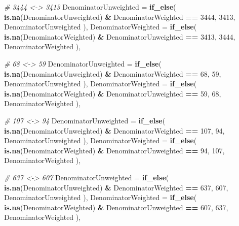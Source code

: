 \documentclass[
]{article}
\newenvironment{Shaded}{\begin{snugshade}}{\end{snugshade}}
\newcommand{\AttributeTok}[1]{\textcolor[rgb]{0.13,0.29,0.53}{#1}}
\newcommand{\CommentTok}[1]{\textcolor[rgb]{0.56,0.35,0.01}{\textit{#1}}}
\newcommand{\DecValTok}[1]{\textcolor[rgb]{0.00,0.00,0.81}{#1}}
\newcommand{\FunctionTok}[1]{\textcolor[rgb]{0.13,0.29,0.53}{\textbf{#1}}}
\newcommand{\NormalTok}[1]{#1}
\newcommand{\SpecialCharTok}[1]{\textcolor[rgb]{0.81,0.36,0.00}{\textbf{#1}}}
\begin{document}
\begin{Shaded}
\begin{Highlighting}[]
    \CommentTok{\# 3444 \textless{}{-}\textgreater{} 3413}
    \AttributeTok{DenominatorUnweighted =} \FunctionTok{if\_else}\NormalTok{(}
      \FunctionTok{is.na}\NormalTok{(DenominatorUnweighted) }\SpecialCharTok{\&}\NormalTok{ DenominatorWeighted }\SpecialCharTok{==} \DecValTok{3444}\NormalTok{,}
      \DecValTok{3413}\NormalTok{,}
\NormalTok{      DenominatorUnweighted}
\NormalTok{    ),}
    \AttributeTok{DenominatorWeighted =} \FunctionTok{if\_else}\NormalTok{(}
      \FunctionTok{is.na}\NormalTok{(DenominatorWeighted) }\SpecialCharTok{\&}\NormalTok{ DenominatorUnweighted }\SpecialCharTok{==} \DecValTok{3413}\NormalTok{,}
      \DecValTok{3444}\NormalTok{,}
\NormalTok{      DenominatorWeighted}
\NormalTok{    ),}

    \CommentTok{\# 68 \textless{}{-}\textgreater{} 59}
    \AttributeTok{DenominatorUnweighted =} \FunctionTok{if\_else}\NormalTok{(}
      \FunctionTok{is.na}\NormalTok{(DenominatorUnweighted) }\SpecialCharTok{\&}\NormalTok{ DenominatorWeighted }\SpecialCharTok{==} \DecValTok{68}\NormalTok{,}
      \DecValTok{59}\NormalTok{,}
\NormalTok{      DenominatorUnweighted}
\NormalTok{    ),}
    \AttributeTok{DenominatorWeighted =} \FunctionTok{if\_else}\NormalTok{(}
      \FunctionTok{is.na}\NormalTok{(DenominatorWeighted) }\SpecialCharTok{\&}\NormalTok{ DenominatorUnweighted }\SpecialCharTok{==} \DecValTok{59}\NormalTok{,}
      \DecValTok{68}\NormalTok{,}
\NormalTok{      DenominatorWeighted}
\NormalTok{    ),}

    \CommentTok{\# 107 \textless{}{-}\textgreater{} 94}
    \AttributeTok{DenominatorUnweighted =} \FunctionTok{if\_else}\NormalTok{(}
      \FunctionTok{is.na}\NormalTok{(DenominatorUnweighted) }\SpecialCharTok{\&}\NormalTok{ DenominatorWeighted }\SpecialCharTok{==} \DecValTok{107}\NormalTok{,}
      \DecValTok{94}\NormalTok{,}
\NormalTok{      DenominatorUnweighted}
\NormalTok{    ),}
    \AttributeTok{DenominatorWeighted =} \FunctionTok{if\_else}\NormalTok{(}
      \FunctionTok{is.na}\NormalTok{(DenominatorWeighted) }\SpecialCharTok{\&}\NormalTok{ DenominatorUnweighted }\SpecialCharTok{==} \DecValTok{94}\NormalTok{,}
      \DecValTok{107}\NormalTok{,}
\NormalTok{      DenominatorWeighted}
\NormalTok{    ),}

    \CommentTok{\# 637 \textless{}{-}\textgreater{} 607}
    \AttributeTok{DenominatorUnweighted =} \FunctionTok{if\_else}\NormalTok{(}
      \FunctionTok{is.na}\NormalTok{(DenominatorUnweighted) }\SpecialCharTok{\&}\NormalTok{ DenominatorWeighted }\SpecialCharTok{==} \DecValTok{637}\NormalTok{,}
      \DecValTok{607}\NormalTok{,}
\NormalTok{      DenominatorUnweighted}
\NormalTok{    ),}
    \AttributeTok{DenominatorWeighted =} \FunctionTok{if\_else}\NormalTok{(}
      \FunctionTok{is.na}\NormalTok{(DenominatorWeighted) }\SpecialCharTok{\&}\NormalTok{ DenominatorUnweighted }\SpecialCharTok{==} \DecValTok{607}\NormalTok{,}
      \DecValTok{637}\NormalTok{,}
\NormalTok{      DenominatorWeighted}
\NormalTok{    ),}


\end{Highlighting}
\end{Shaded}
\end{document}
